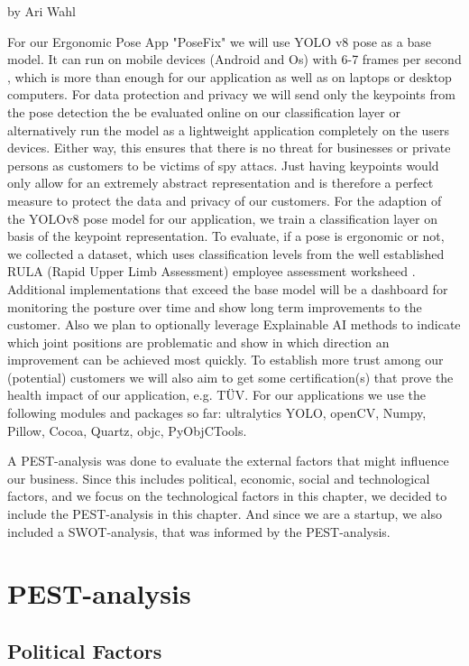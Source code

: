 by Ari Wahl

For our Ergonomic Pose App "PoseFix" we will use YOLO v8 pose as a base model. 
It can run on mobile devices (Android and Os) with 6-7 frames per second \cite{ultralytics2022}, 
which is more than enough for our application as well as on laptops or desktop computers. For data protection and privacy we will send only the keypoints from the pose detection 
the be evaluated online on our classification layer or alternatively run the model as a lightweight application completely on the users devices. 
Either way, this ensures that there is no threat for businesses or private persons as customers to be victims of spy attacs. Just having keypoints 
would only allow for an extremely abstract representation and is therefore a perfect measure to protect the data and privacy of our customers. 
For the adaption of the YOLOv8 pose model for our application, we train a classification layer on basis of the keypoint representation. 
To evaluate, if a pose is ergonomic or not, we collected a dataset, which uses classification levels from the well established RULA (Rapid Upper Limb Assessment) employee assessment 
worksheed \cite{Holzgreve_2022}. 
Additional implementations that exceed the base model will be a dashboard for monitoring the posture over time and show long term improvements 
to the customer. Also we plan to optionally leverage Explainable AI methods to indicate which joint positions are problematic and show
 in which direction an improvement can be achieved most quickly. To establish more trust among our (potential) customers 
 we will also aim to get some certification(s) that prove the health impact of our application, e.g. TÜV. 
For our applications we use the following modules and packages so far: ultralytics YOLO, openCV, Numpy, Pillow, Cocoa, Quartz, objc, PyObjCTools. 


A PEST-analysis was done to evaluate the external factors that might influence our business. Since this includes political, economic, social and technological factors, 
and we focus on the technological factors in this chapter, we decided to include the PEST-analysis in this chapter. And since we are a startup, we also included a 
SWOT-analysis, that was informed by the PEST-analysis. 

\section{PEST-analysis}

\subsection{Political Factors}


